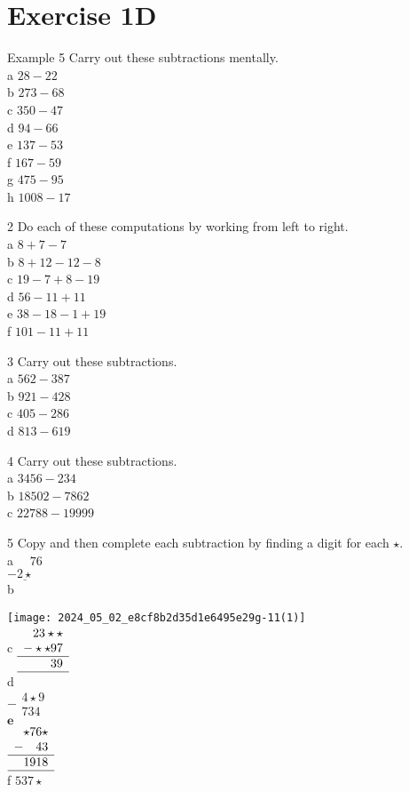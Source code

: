 \documentclass[10pt]{article}
\begin{document}
\section*{Exercise 1D}
Example 5 Carry out these subtractions mentally.\\
a \(28-22\)\\
b \(273-68\)\\
c \(350-47\)\\
d \(94-66\)\\
e \(137-53\)\\
f \(167-59\)\\
g \(475-95\)\\
h \(1008-17\)

2 Do each of these computations by working from left to right.\\
a \(8+7-7\)\\
b \(8+12-12-8\)\\
c \(19-7+8-19\)\\
d \(56-11+11\)\\
e \(38-18-1+19\)\\
f \(101-11+11\)

3 Carry out these subtractions.\\
a \(562-387\)\\
b \(921-428\)\\
c \(405-286\)\\
d \(813-619\)

4 Carry out these subtractions.\\
a \(3456-234\)\\
b \(18502-7862\)\\
c \(22788-19999\)

5 Copy and then complete each subtraction by finding a digit for each \(\star\).\\
a \(\quad 76\)\\
\(-\underline{2 \star}\)\\
b

\texttt{[image: 2024\_05\_02\_e8cf8b2d35d1e6495e29g-11(1)]}\\
c \(\begin{array}{r}23 \star \star \\ -\star \star 97 \\ \hline \quad 39 \\ \hline\end{array}\)\\
d\\
\(-\begin{array}{r}4 \star 9 \\ \hline 734\end{array}\)\\
\(\mathbf{e}\)\\
\(\begin{array}{r}\star 76 \star \\ -\quad 43 \\ \hline 1918 \\ \hline\end{array}\)\\
f \(537 \star\)
\end{document}
